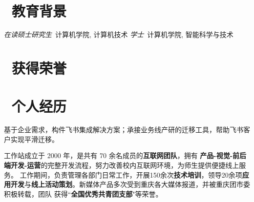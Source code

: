 \documentclass{resume}
\begin{document}



  \section{\faGraduationCap\  教育背景}
  \textit{在读硕士研究生}\ 计算机学院, 计算机技术
  \textit{学士}\ 计算机学院, 智能科学与技术

\section{\faHeartO\ 获得荣誉}

  \section{\faCogs\ 个人经历}


  \begin{onehalfspacing}
  基于企业需求，构件飞书集成解决方案；承接业务线产研的迁移工具，帮助飞书客户实现平滑迁移。
  \end{onehalfspacing}


  \begin{onehalfspacing}
    工作站成立于 2000 年，是共有 70 余名成员的\textbf{互联网团队}，拥有 \textbf{产品-视觉-前后端开发-运营}的完整开发流程，努力改善校内互联网环境，为师生提供便捷线上服务。
    工作期间，负责管理各部门日常工作，开展150余次\textbf{技术培训}，领导20余项\textbf{应用开发}与\textbf{线上活动策划}。新媒体产品多次受到重庆各大媒体报道，并被重庆团市委积极转载，团队
    获得``\textbf{全国优秀共青团支部}"等荣誉。
  \end{onehalfspacing}

\end{document}
